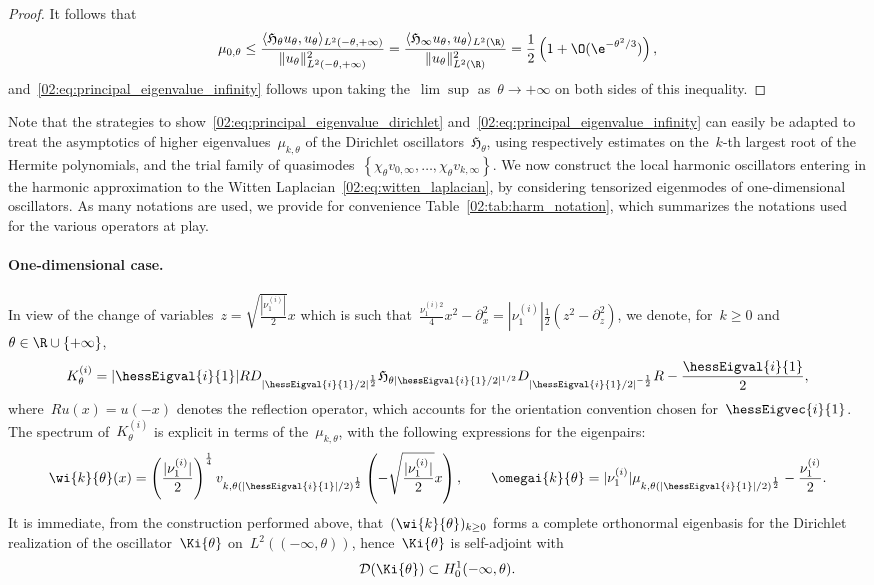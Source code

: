 \begin{proof}
        It follows that
        \[\mu_{0,\theta} \leq \frac{\langle \mathfrak{H}_\theta u_\theta,u_\theta\rangle_{L^2(-\theta,+\infty)}}{\|u_\theta\|^2_{L^2(-\theta,+\infty)}}=\frac{\langle \mathfrak{H}_\infty u_\theta,u_\theta\rangle_{L^2(\R)}}{\|u_\theta\|^2_{L^2(\R)}} = \frac{1}{2}\left(1+\O(\e^{-\theta^2/3})\right),\]
        and~\eqref{02:eq:principal_eigenvalue_infinity} follows upon taking the~$\lim\sup$ as~$\theta\to+\infty$ on both sides of this inequality.        
    \end{proof}
    Note that the strategies to show~\eqref{02:eq:principal_eigenvalue_dirichlet} and~\eqref{02:eq:principal_eigenvalue_infinity} can easily be adapted to treat the asymptotics of higher eigenvalues~$\mu_{k,\theta}$ of the Dirichlet oscillators~$\mathfrak{H}_\theta$, using respectively estimates on the~$k$-th largest root of the Hermite polynomials, and the trial family of quasimodes~$\left\{\chi_\theta v_{0,\infty},\dots,\chi_\theta v_{k,\infty}\right\}$.
    We now construct the local harmonic oscillators entering in the harmonic approximation to the Witten Laplacian~\eqref{02:eq:witten_laplacian}, by considering tensorized eigenmodes of one-dimensional oscillators. As many notations are used, we provide for convenience Table~\ref{02:tab:harm_notation}, which summarizes the notations used for the various operators at play.

    \paragraph{One-dimensional case.}
    In view of the change of variables~$z=\sqrt{\frac{|\nu_1^{(i)}|}2}x$ which is such that~$\frac{\nu_1^{(i)2}}4 x^2-\partial_x^2 = |\nu_1^{(i)}|\frac12\left(z^2-\partial_z^2\right)$, we denote, for~$k\geq 0$ and~$\theta\in \R\cup\{+\infty\}$, 
    $$K^{(i)}_\theta = |\hessEigval{i}{1}|R D_{|\hessEigval{i}{1}/2|^{\frac12}}\mathfrak{H}_{\theta|\hessEigval{i}{1}/2|^{1/2}}D_{|\hessEigval{i}{1}/2|^{-\frac12}}R - \frac{\hessEigval{i}{1}}2,$$
    where~$R u(x) = u(-x)$ denotes the reflection operator, which accounts for the orientation convention chosen for~$\hessEigvec{i}{1}$. The spectrum of~$K^{(i)}_\theta$ is explicit in terms of the~$\mu_{k,\theta}$, with the following expressions for the eigenpairs:
    \begin{equation}
        \label{02:eq:hermite_eigenfunction_scaled}
        \wi{k}{\theta}(x) = \left(\frac{|\nu_1^{(i)}|}{2}\right)^{\frac14}v_{k,\theta(|\hessEigval{i}{1}|/2)^{\frac12}}\left(-\sqrt{\frac{|\nu^{(i)}_1|}2}x\right) ,\qquad \omegai{k}{\theta} = |\nu^{(i)}_1|\mu_{k,\theta(|\hessEigval{i}{1}|/2)^{\frac12}} - \frac{\nu^{(i)}_1}2.
    \end{equation}
    It is immediate, from the construction performed above, that~$(\wi{k}{\theta})_{k\geq 0}$ forms a complete orthonormal eigenbasis for the Dirichlet realization of the oscillator~$\Ki{\theta}$ on~$L^2((-\infty,\theta))$, hence~$\Ki{\theta}$ is self-adjoint with
        \begin{equation}
            \label{02:eq:full_oscillator_domain}
            \mathcal D(\Ki{\theta}) \subset H_0^1(-\infty,\theta).
        \end{equation}
        
